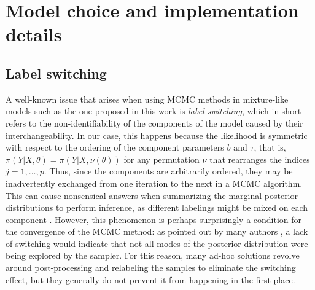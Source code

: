 %
%



\section{Model choice and implementation details}

\subsection{Label switching}\label{app:label-switching}

A well-known issue that arises when using MCMC methods in mixture-like models such as the one proposed in this work is \textit{label switching}, which in short refers to the non-identifiability of the components of the model caused by their interchangeability. In our case, this happens because the likelihood is symmetric with respect to the ordering of the component parameters \(b\) and \(\tau\), that is, \(\pi(Y|X,\theta)=\pi(Y|X, \nu(\theta))\) for any permutation \(\nu\) that rearranges the indices \(j=1,\dots, p\). Thus, since the components are arbitrarily ordered, they may be inadvertently exchanged from one iteration to the next in a MCMC algorithm. This can cause nonsensical answers when summarizing the marginal posterior distributions to perform inference, as different labelings might be mixed on each component \citep{stephens2000dealing}. However, this phenomenon is perhaps surprisingly a condition for the convergence of the MCMC method: as pointed out by many authors \citep[e.g.][]{celeux2000computational}, a lack of switching would indicate that not all modes of the posterior distribution were being explored by the sampler. For this reason, many ad-hoc solutions revolve around post-processing and relabeling the samples to eliminate the switching effect, but they generally do not prevent it from happening in the first place.

